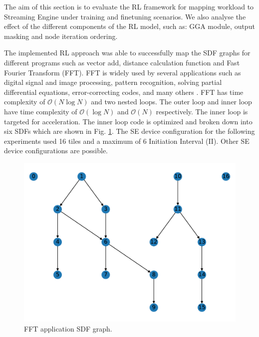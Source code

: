 
The aim of this section is to evaluate the RL framework for mapping workload to Streaming Engine under training and finetuning scenarios. 
We also analyse the effect of the different components of the RL model, such as: GGA module, output masking and node iteration ordering.

The implemented RL approach was able to successfully map the SDF graphs for different programs such as vector add, distance calculation function and Fast Fourier Transform (FFT). 
FFT is widely used by several applications such as digital signal and image processing, pattern recognition, solving partial differential equations, error-correcting codes, and many others \cite{814659}.
FFT has time complexity of $\mathcal{O}(N\log{N})$ and two nested loops.
The outer loop and inner loop have time complexity of $\mathcal{O}(\log{N})$ and $\mathcal{O}(N)$ respectively.
The inner loop is targeted for acceleration.
The inner loop code is optimized and broken down into six SDFs which are shown in Fig. \ref{fig:ifft_graph}.
The SE device configuration for the following experiments used 16 tiles and a maximum of 6 Initiation Interval (II).
Other SE device configurations are possible.

\begin{figure}[h]
  \centering
  \includegraphics[width=\linewidth]{fig/ifft_graph.pdf}
  \caption{FFT application SDF graph.}
  \label{fig:ifft_graph}
\end{figure}


